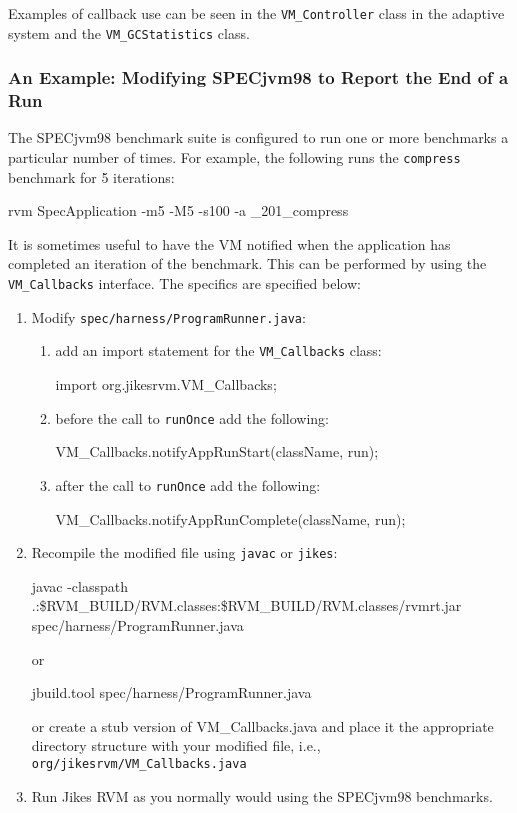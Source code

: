 Examples of callback use can be seen in the {\tt VM\_Controller} class in the
adaptive system and the {\tt VM\_GCStatistics} class.

\subsubsection{An Example: Modifying SPECjvm98 to Report the End of a
                  Run}\label{sssec:callback-example}

The SPECjvm\Rboth{}98 benchmark suite is configured to run one or more
benchmarks 
a particular number of times.  For example, the following runs the
{\tt compress} benchmark for 5 iterations:
\begin{example}
 rvm SpecApplication -m5 -M5 -s100 -a \_201\_compress
\end{example}
It is sometimes useful to have the VM notified when the application
has completed an iteration of the benchmark.   This can be performed
by using the {\tt VM\_Callbacks} interface.  The specifics are
specified below:
\begin{enumerate}
\item Modify {\tt spec/harness/ProgramRunner.java}:
	\begin{enumerate}

	\item add an import statement for the {\tt VM\_Callbacks} class:
        \begin{example}
        import org.jikesrvm.VM\_Callbacks;
        \end{example}

	\item before the call to {\tt runOnce} add the following:
        \begin{example}
        VM\_Callbacks.notifyAppRunStart(className, run);
        \end{example}

	\item after the call to {\tt runOnce} add the following:
        \begin{example}
        VM\_Callbacks.notifyAppRunComplete(className, run);
        \end{example}

	\end{enumerate}

\item Recompile the modified file using {\tt javac} or {\tt jikes}:
\begin{example}
javac -classpath 
   .:\$RVM\_\-BUILD/\-RVM.clas\-ses:\$RVM\_\-BUILD/\-RVM.clas\-ses/\-rvmrt.jar
   spec/\-har\-ness/\-Pro\-gram\-Run\-ner.java
\end{example}
or
\begin{example}
jbuild.tool spec/\-har\-ness/\-Pro\-gram\-Run\-ner.java
\end{example}

or create a stub version of VM\_Callbacks.java and place
it the appropriate directory structure with your modified file, i.e., 
{\tt org/jikesrvm/VM\_Callbacks.java}

\item Run Jikes RVM as you normally would using the SPECjvm98 benchmarks.
\end{enumerate}

